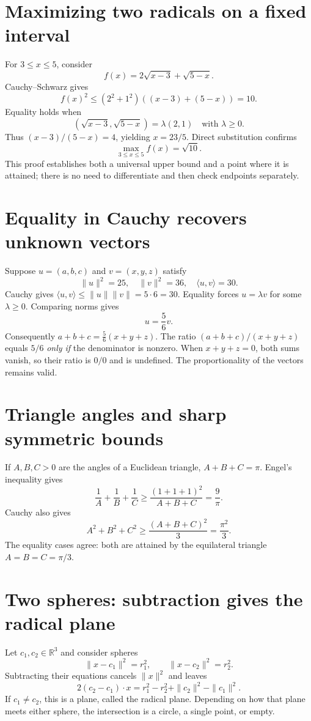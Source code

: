 \section{Maximizing two radicals on a fixed interval}

For \(3\le x\le5\), consider
\[
 f(x)=2\sqrt{x-3}+\sqrt{5-x}.
\]
Cauchy--Schwarz gives
\[
 f(x)^2\le(2^2+1^2)((x-3)+(5-x))=10.
\]
Equality holds when
\[
 (\sqrt{x-3},\sqrt{5-x})=\lambda(2,1)
 \quad\text{with }\lambda\ge0.
\]
Thus \((x-3)/(5-x)=4\), yielding \(x=23/5\). Direct substitution confirms
\[
 \boxed{\max_{3\le x\le5}f(x)=\sqrt{10}.}
\]
This proof establishes both a universal upper bound and a point where it is attained; there is no need to differentiate and then check endpoints separately.

\section{Equality in Cauchy recovers unknown vectors}

Suppose \(u=(a,b,c)\) and \(v=(x,y,z)\) satisfy
\[
 \|u\|^2=25,\quad \|v\|^2=36,\quad \langle u,v\rangle=30.
\]
Cauchy gives \(\langle u,v\rangle\le\|u\|\|v\|=5\cdot6=30\). Equality forces \(u=\lambda v\) for some \(\lambda\ge0\). Comparing norms gives
\[
 u=\frac56v.
\]
Consequently \(a+b+c=\frac56(x+y+z)\). The ratio \((a+b+c)/(x+y+z)\) equals \(5/6\) \emph{only if} the denominator is nonzero. When \(x+y+z=0\), both sums vanish, so their ratio is \(0/0\) and is undefined. The proportionality of the vectors remains valid.

\section{Triangle angles and sharp symmetric bounds}

If \(A,B,C>0\) are the angles of a Euclidean triangle, \(A+B+C=\pi\). Engel's inequality gives
\[
 \frac1A+\frac1B+\frac1C
 \ge\frac{(1+1+1)^2}{A+B+C}
 =\frac9\pi.
\]
Cauchy also gives
\[
 A^2+B^2+C^2\ge\frac{(A+B+C)^2}{3}
 =\frac{\pi^2}{3}.
\]
The equality cases agree: both are attained by the equilateral triangle \(A=B=C=\pi/3\).

\section{Two spheres: subtraction gives the radical plane}

Let \(c_1,c_2\in\mathbb R^3\) and consider spheres
\[
 \|x-c_1\|^2=r_1^2,\qquad \|x-c_2\|^2=r_2^2.
\]
Subtracting their equations cancels \(\|x\|^2\) and leaves
\[
 2(c_2-c_1)\cdot x
 =r_1^2-r_2^2+\|c_2\|^2-\|c_1\|^2.
\]
If \(c_1\ne c_2\), this is a plane, called the radical plane. Depending on how that plane meets either sphere, the intersection is a circle, a single point, or empty.

